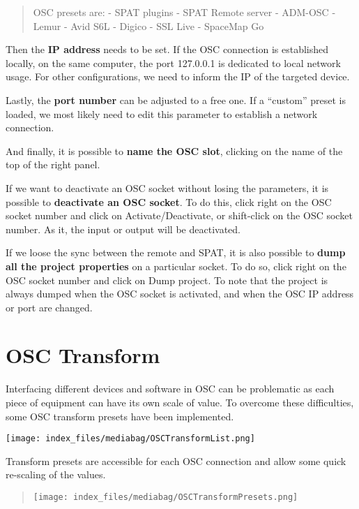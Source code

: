 \documentclass[
  letterpaper,
  DIV=11,
  numbers=noendperiod]{scrreport}
\begin{document}
\begin{quote}
OSC presets are: - SPAT plugins - SPAT Remote server - ADM-OSC - Lemur -
Avid S6L - Digico - SSL Live - SpaceMap Go
\end{quote}

Then the \textbf{IP address} needs to be set. If the OSC connection is
established locally, on the same computer, the port 127.0.0.1 is
dedicated to local network usage. For other configurations, we need to
inform the IP of the targeted device.

Lastly, the \textbf{port number} can be adjusted to a free one. If a
``custom'' preset is loaded, we most likely need to edit this parameter
to establish a network connection.

And finally, it is possible to \textbf{name the OSC slot}, clicking on
the name of the top of the right panel.

If we want to deactivate an OSC socket without losing the parameters, it
is possible to \textbf{deactivate an OSC socket}. To do this, click
right on the OSC socket number and click on Activate/Deactivate, or
shift-click on the OSC socket number. As it, the input or output will be
deactivated.

If we loose the sync between the remote and SPAT, it is also possible to
\textbf{dump all the project properties} on a particular socket. To do
so, click right on the OSC socket number and click on Dump project. To
note that the project is always dumped when the OSC socket is activated,
and when the OSC IP address or port are changed.

\hypertarget{osc-transform}{%
\section{OSC Transform}\label{osc-transform}}

Interfacing different devices and software in OSC can be problematic as
each piece of equipment can have its own scale of value. To overcome
these difficulties, some OSC transform presets have been implemented.

\texttt{[image: index\_files/mediabag/OSCTransformList.png]}

Transform presets are accessible for each OSC connection and allow some
quick re-scaling of the values.

\begin{quote}
\texttt{[image: index\_files/mediabag/OSCTransformPresets.png]}
\end{quote}
\end{document}
